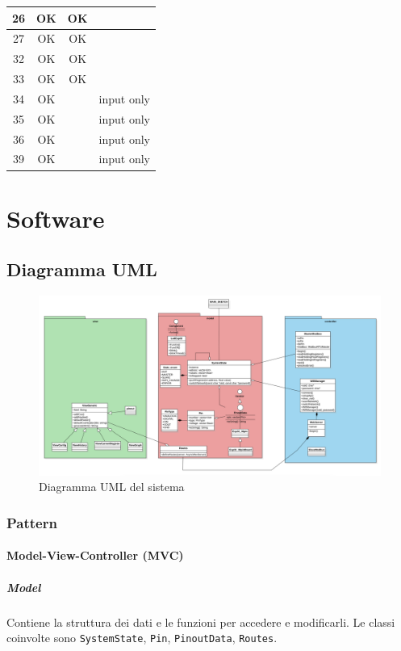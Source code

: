 \documentclass[12pt,a4paper]{report}
\begin{document}
\begin{table}[H]
\begin{tabular}{|c|c|c|p{8cm}|}
        26 & OK & OK & \\ \hline
        27 & OK & OK & \\ \hline
        32 & OK & OK & \\ \hline
        33 & OK & OK & \\ \hline
        34 & OK &  & input only \\ \hline
        35 & OK &  & input only \\ \hline
        36 & OK &  & input only \\ \hline
        39 & OK &  & input only \\ \hline
    \end{tabular}
\end{table}
    
    

\chapter{Software}
\section{Diagramma UML}
\begin{figure}[H]
    \centering
    \includegraphics[width=\linewidth]{../image/uml.png}
    \caption{Diagramma UML del sistema}
\end{figure}
\subsection{Pattern}
\subsubsection{Model-View-Controller (MVC)}
\paragraph{Model} Contiene la struttura dei dati e le funzioni per accedere e modificarli. 
Le classi coinvolte sono \texttt{SystemState}, \texttt{Pin}, \texttt{PinoutData}, \texttt{Routes}.
\end{document}
